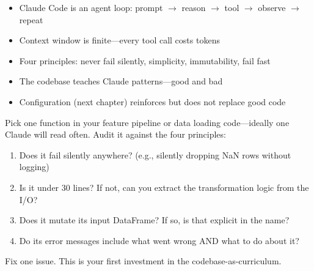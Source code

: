 \begin{itemize}
  \item Claude Code is an agent loop: prompt $\rightarrow$ reason $\rightarrow$ tool $\rightarrow$ observe $\rightarrow$ repeat
  \item Context window is finite---every tool call costs tokens
  \item Four principles: never fail silently, simplicity, immutability, fail fast
  \item The codebase teaches Claude patterns---good and bad
  \item Configuration (next chapter) reinforces but does not replace good code
\end{itemize}

\begin{trybox}
Pick one function in your feature pipeline or data loading code---ideally
one Claude will read often. Audit it against the four principles:
\begin{enumerate}
  \item Does it fail silently anywhere? (e.g., silently dropping NaN rows
    without logging)
  \item Is it under 30 lines? If not, can you extract the transformation
    logic from the I/O?
  \item Does it mutate its input DataFrame? If so, is that explicit
    in the name?
  \item Do its error messages include what went wrong AND what to do about it?
\end{enumerate}
Fix one issue. This is your first investment in the codebase-as-curriculum.
\end{trybox}
